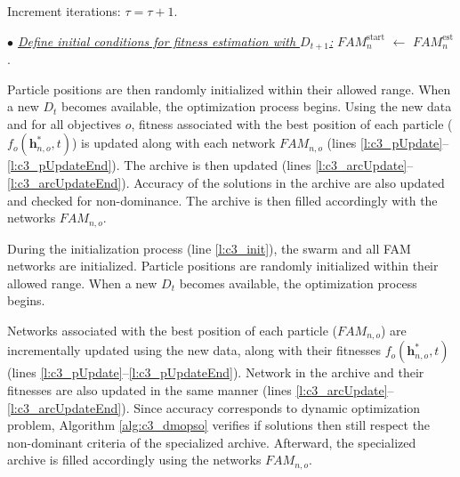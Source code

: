 \begin{algorithm}[t]
{\begin{minipage}{0.97\linewidth}
\begin{algorithmic}[1]
				\EndFor																					\label{l:c3_pAdjustEnd}

				\State Increment iterations: $\tau = \tau + 1$.    \label{l:c3_itUpdate}
			\EndWhile 																						\label{l:c3_endOpt}

			\Statex\vspace{6pt}\textit{$\bullet$ \underline{Define initial conditions for fitness estimation with $D_{t+1}$:}}\vspace{3pt}
					\label{l:c3_sUpdate}
				\State $\textit{FAM}_n^\text{start}$ $\leftarrow$
							 $\textit{FAM}_n^\text{est}$.
			\EndFor   \label{l:c3_sUpdateEnd}
	\end{algorithmic}
		\end{minipage} }

\end{algorithm}

Particle positions are then randomly initialized within their allowed range.
When a new $D_t$ becomes available, the optimization process begins.
Using the new data and for all objectives $o$, fitness associated with the best position of each particle ($f_o(\textbf{h}^*_{n,o},t)$) is updated along with each network $\textit{FAM}_{n,o}$ (lines \ref{l:c3_pUpdate}--\ref{l:c3_pUpdateEnd}).
The archive is then updated (lines \ref{l:c3_arcUpdate}--\ref{l:c3_arcUpdateEnd}).
Accuracy of the solutions in the archive are also updated and checked for non-dominance.
The archive is then filled accordingly with the networks $\textit{FAM}_{n,o}$.

During the initialization process (line \ref{l:c3_init}), the swarm and all FAM networks are initialized.
Particle positions are randomly initialized within their allowed range.
When a new $D_t$ becomes available, the optimization process begins.

Networks associated with the best position of each particle ($\textit{FAM}_{n,o}$) are incrementally updated using the new data, along with their fitnesses $f_o(\textbf{h}^*_{n,o},t)$ (lines \ref{l:c3_pUpdate}--\ref{l:c3_pUpdateEnd}).
Network in the archive and their fitnesses are also updated in the same manner (lines \ref{l:c3_arcUpdate}--\ref{l:c3_arcUpdateEnd}).
Since accuracy corresponds to dynamic optimization problem, Algorithm \ref{alg:c3_dmopso} verifies if solutions then still respect the non-dominant criteria of the specialized archive.
Afterward, the specialized archive is filled accordingly using the networks $\textit{FAM}_{n,o}$.

